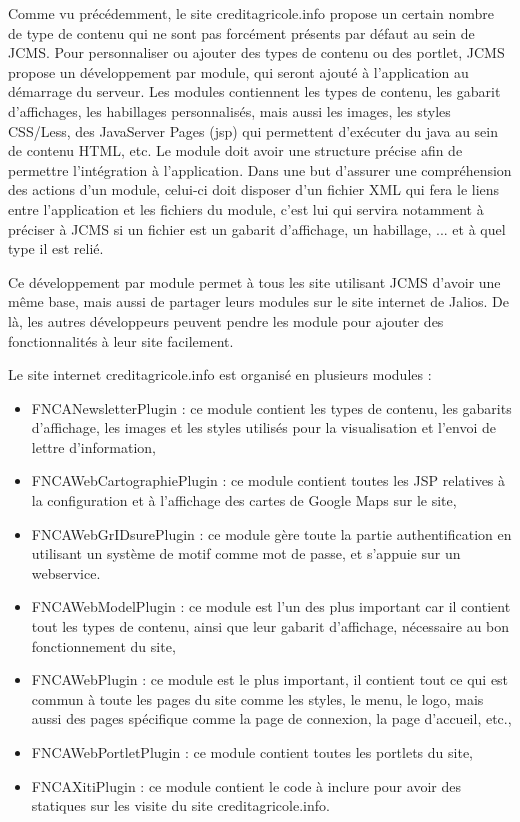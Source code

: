\documentclass[12pt,a4paper]{article}
\begin{document}
\medskip
Comme vu précédemment, le site creditagricole.info propose un certain nombre de type de contenu qui ne sont pas forcément présents par défaut au sein de \gls{JCMS}. Pour personnaliser ou ajouter des types de contenu ou des portlet, \gls{JCMS} propose un développement par module, qui seront ajouté à l'application au démarrage du serveur. Les modules contiennent les types de contenu, les gabarit d'affichages, les habillages personnalisés, mais aussi les images, les styles CSS/Less, des JavaServer Pages (jsp) qui permettent d'exécuter du java au sein de contenu HTML, etc. Le module doit avoir une structure précise afin de permettre l'intégration à l'application. Dans une but d'assurer une compréhension des actions d'un module, celui-ci doit disposer d'un fichier XML qui fera le liens entre l'application et les fichiers du module, c'est lui qui servira notamment à préciser à \gls{JCMS} si un fichier est un gabarit d'affichage, un habillage, ... et à quel type il est relié.\par 
Ce développement par module permet à tous les site utilisant \gls{JCMS} d'avoir une même base, mais aussi de partager leurs modules sur le site internet de Jalios. De là, les autres développeurs peuvent pendre les module pour ajouter des fonctionnalités à leur site facilement.\par 
Le site internet creditagricole.info est organisé en plusieurs modules :
\begin{itemize}
\item FNCANewsletterPlugin : ce module contient les types de contenu, les gabarits d'affichage, les images et les styles utilisés pour la visualisation et l'envoi de lettre d'information,
\item FNCAWebCartographiePlugin : ce module contient toutes les JSP relatives à la configuration et à l'affichage des cartes de Google Maps sur le site,
\item FNCAWebGrIDsurePlugin : ce module gère toute la partie authentification en utilisant un système de motif comme mot de passe, et s'appuie sur un webservice.
\item FNCAWebModelPlugin : ce module est l'un des plus important car il contient tout les types de contenu, ainsi que leur gabarit d'affichage, nécessaire au bon fonctionnement du site,
\item FNCAWebPlugin : ce module est le plus important, il contient tout ce qui est commun à toute les pages du site comme les styles, le menu, le logo, mais aussi des pages spécifique comme la page de connexion, la page d'accueil, etc.,
\item FNCAWebPortletPlugin : ce module contient toutes les portlets du site,
\item FNCAXitiPlugin : ce module contient le code à inclure pour avoir des statiques sur les visite du site creditagricole.info.
\end{itemize}\par
\end{document}
